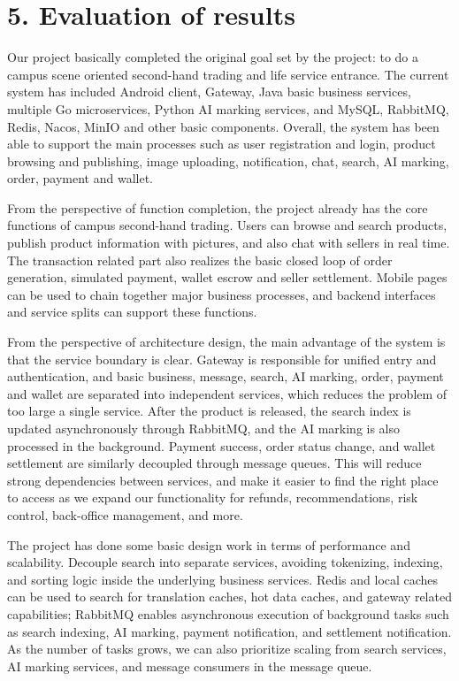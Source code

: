 \documentclass{article}
\begin{document}
\section{5. Evaluation of results}

Our project basically completed the original goal set by the project: to do a campus scene oriented second-hand trading and life service entrance. The current system has included Android client, Gateway, Java basic business services, multiple Go microservices, Python AI marking services, and MySQL, RabbitMQ, Redis, Nacos, MinIO and other basic components. Overall, the system has been able to support the main processes such as user registration and login, product browsing and publishing, image uploading, notification, chat, search, AI marking, order, payment and wallet.

From the perspective of function completion, the project already has the core functions of campus second-hand trading. Users can browse and search products, publish product information with pictures, and also chat with sellers in real time. The transaction related part also realizes the basic closed loop of order generation, simulated payment, wallet escrow and seller settlement. Mobile pages can be used to chain together major business processes, and backend interfaces and service splits can support these functions.

From the perspective of architecture design, the main advantage of the system is that the service boundary is clear. Gateway is responsible for unified entry and authentication, and basic business, message, search, AI marking, order, payment and wallet are separated into independent services, which reduces the problem of too large a single service. After the product is released, the search index is updated asynchronously through RabbitMQ, and the AI marking is also processed in the background. Payment success, order status change, and wallet settlement are similarly decoupled through message queues. This will reduce strong dependencies between services, and make it easier to find the right place to access as we expand our functionality for refunds, recommendations, risk control, back-office management, and more.

The project has done some basic design work in terms of performance and scalability. Decouple search into separate services, avoiding tokenizing, indexing, and sorting logic inside the underlying business services. Redis and local caches can be used to search for translation caches, hot data caches, and gateway related capabilities; RabbitMQ enables asynchronous execution of background tasks such as search indexing, AI marking, payment notification, and settlement notification. As the number of tasks grows, we can also prioritize scaling from search services, AI marking services, and message consumers in the message queue.
\end{document}
